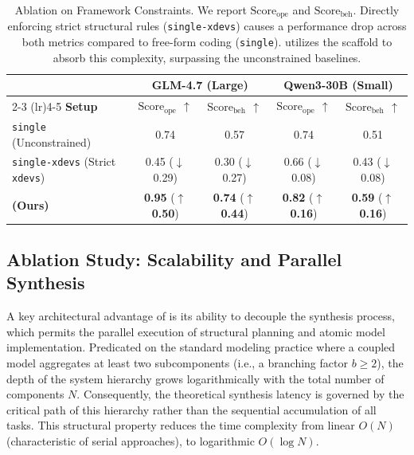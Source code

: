 \begin{table}[h]
\centering
\caption{Ablation on Framework Constraints. We report $\text{Score}_{\text{ope}}$ and $\text{Score}_{\text{beh}}$. Directly enforcing strict structural rules (\texttt{single-xdevs}) causes a performance drop across both metrics compared to free-form coding (\texttt{single}). \methodname{} utilizes the \plantree{} scaffold to absorb this complexity, surpassing the unconstrained baselines.}
\label{tab:ablation_xdevs}
\begin{tabular}{@{}lcccc@{}}
\toprule
& \multicolumn{2}{c}{\textbf{GLM-4.7 (Large)}} & \multicolumn{2}{c}{\textbf{Qwen3-30B (Small)}} \\
\cmidrule(lr){2-3} \cmidrule(lr){4-5}
\textbf{Setup} & \textbf{$\text{Score}_{\text{ope}}$ $\uparrow$} & \textbf{$\text{Score}_{\text{beh}}$ $\uparrow$} & \textbf{$\text{Score}_{\text{ope}}$ $\uparrow$} & \textbf{$\text{Score}_{\text{beh}}$ $\uparrow$} \\ \midrule
\texttt{single} (Unconstrained) & 0.74 & 0.57 & 0.74 & 0.51 \\
\texttt{single-xdevs} (Strict \texttt{xdevs}) & 0.45 ($\downarrow$ 0.29) & 0.30 ($\downarrow$ 0.27) & 0.66 ($\downarrow$ 0.08) & 0.43 ($\downarrow$ 0.08) \\
\midrule
\rowcolor{gray!15}
\textbf{\methodname{} (Ours)} & \textbf{0.95} ($\uparrow$ \textbf{0.50}) & \textbf{0.74} ($\uparrow$ \textbf{0.44}) & \textbf{0.82} ($\uparrow$ \textbf{0.16}) & \textbf{0.59} ($\uparrow$ \textbf{0.16}) \\ \bottomrule
\end{tabular}
\end{table}

\subsection{Ablation Study: Scalability and Parallel Synthesis}
\label{sec:ablation}

A key architectural advantage of \methodname{} is its ability to decouple the synthesis process, which permits the parallel execution of structural planning and atomic model implementation. Predicated on the standard modeling practice where a coupled model aggregates at least two subcomponents (i.e., a branching factor $b \ge 2$), the depth of the system hierarchy grows logarithmically with the total number of components $N$. Consequently, the theoretical synthesis latency is governed by the critical path of this hierarchy rather than the sequential accumulation of all tasks. This structural property reduces the time complexity from linear $O(N)$ (characteristic of serial approaches), to logarithmic $O(\log N)$.


